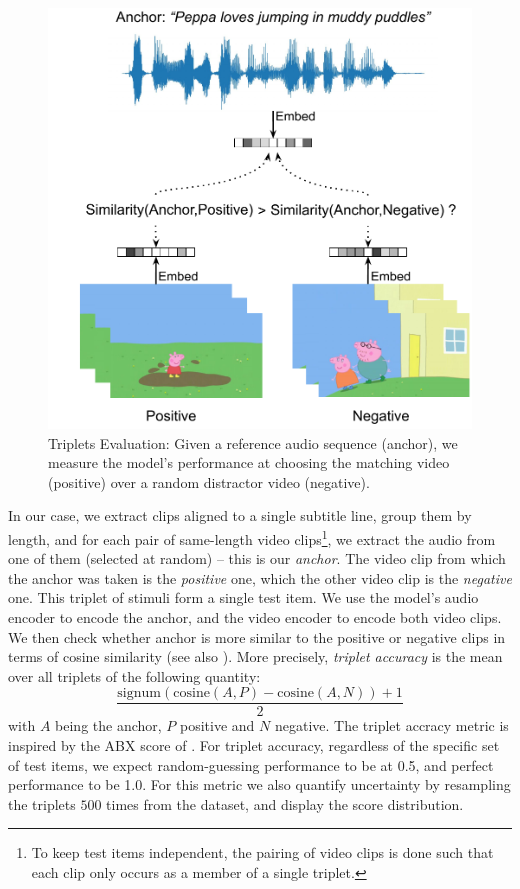 \begin{figure}
	\centering
	\includegraphics[width=\columnwidth]{peppa_triplets_eval_detailed.pdf}
	\caption{Triplets Evaluation: Given a reference audio sequence (anchor), we 
	measure the model's performance at choosing the matching video (positive) 
	over a random distractor video (negative).}
	\label{fig:triplets_eval}
\end{figure}

In our case, we extract clips aligned to a single subtitle
line, group them by length, and for each pair of same-length video
clips\footnote{To keep test items independent, the pairing of video
  clips is done such that each clip only occurs as a member of a single
  triplet.}, we extract the audio from one of them (selected at
random) -- this is our {\it anchor}. The video clip from which the
anchor was taken is the {\it positive} one, which the other video clip
is the {\it negative} one. This triplet of stimuli form a single test
item.  We use the model's audio encoder to encode the anchor, and the
video encoder to encode both video clips. We then check whether anchor
is more similar to the positive or negative clips in terms of cosine
similarity (see also ).  More precisely, {\it triplet 
accuracy} is the mean over
all triplets of the following quantity:
\begin{equation}
  \frac{\mathrm{signum}(\mathrm{cosine}(A, P) - \mathrm{cosine}(A, N)) + 1}{2}
  \label{eq:triplet-acc}
\end{equation}
with $A$ being the anchor, $P$ positive and $N$ negative. The triplet
accracy metric is inspired by the ABX score of \citet{schatz2016abx}.
For triplet accuracy, regardless of the specific set of test items, we
expect random-guessing performance to be at 0.5, and perfect
performance to be 1.0. For this metric we also quantify uncertainty by
resampling the triplets $500$ times from the dataset, and display the
score distribution.

